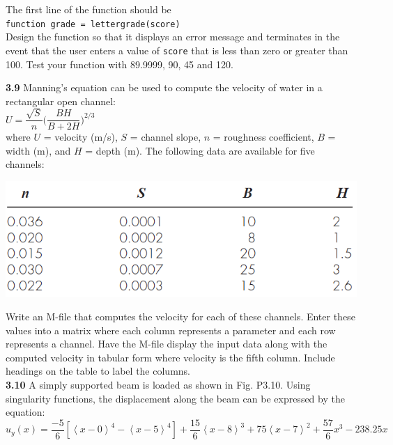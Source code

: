 \documentclass[../main.tex]{subfiles}
\begin{document}
\begin{multicols}{2}
    \noindent The first line of the function should be\\

    \texttt{function grade = lettergrade(score)}\\

    \noindent
    Design the function so that it displays an error message and
    terminates in the event that the user enters a value of \texttt{score}
    that is less than zero or greater than 100. Test your function
    with 89.9999, 90, 45 and 120.

    \noindent\textbf{3.9} Manning's equation can be used to compute the velocity
    of water in a rectangular open channel:\\

    $U = \dfrac{\sqrt{S}}{n}\Big(\dfrac{BH}{B + 2H} \Big)^{2/3}$\\

    \noindent where $U$ = velocity (m/s), $S$ = channel slope, $n$ = roughness
    coefficient, $B$ = width (m), and $H$ = depth (m). The following
    data are available for five channels:

    \noindent
    \begin{minipage}{\linewidth}
        \centering
        \includegraphics[width=0.9\linewidth]{./images/problem_3_3_8}
    \end{minipage}

    \noindent
    Write an M-file that computes the velocity for each of these
    channels. Enter these values into a matrix where each column
    represents a parameter and each row represents a channel.
    Have the M-file display the input data along with
    the computed velocity in tabular form where velocity is the
    fifth column. Include headings on the table to label the
    columns.\\

    \noindent\textbf{3.10} A simply supported beam is loaded as shown in
    Fig. P3.10. Using singularity functions, the displacement
    along the beam can be expressed by the equation:\\

    $u_y(x) = \dfrac{-5}{6}[\left\langle x - 0 \right\rangle^4 - \left\langle x-5 \right\rangle^4]
    +\dfrac{15}{6} \left\langle x-8 \right\rangle^3 +75\left\langle x-7 \right\rangle^2
    +\dfrac{57}{6}x^3 - 238.25x$\\


\end{multicols}
\end{document}
